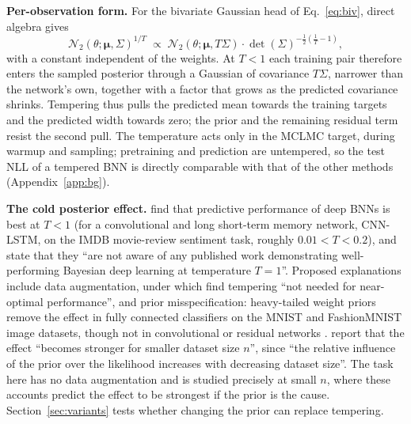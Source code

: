 \documentclass[11pt]{article}
\begin{document}
\textbf{Per-observation form.} For the bivariate Gaussian head of Eq.~\eqref{eq:biv}, direct algebra gives
\begin{equation}
\label{eq:tempered_obs}
\mathcal{N}_2(\theta;\boldsymbol\mu,\Sigma)^{1/T}\;\propto\;\mathcal{N}_2(\theta;\boldsymbol\mu,T\Sigma)\cdot\det(\Sigma)^{-\frac12\left(\frac1T-1\right)},
\end{equation}
with a constant independent of the weights. At $T<1$ each training pair therefore enters the sampled posterior
through a Gaussian of covariance $T\Sigma$, narrower than the network's own, together with a factor that grows
as the predicted covariance shrinks. Tempering thus pulls the predicted mean towards the training targets and
the predicted width towards zero; the prior and the remaining residual term resist the second pull.
The temperature acts only in the MCLMC target, during warmup and sampling; pretraining and prediction are untempered,
so the test NLL of a tempered BNN is directly comparable with that of the other methods (Appendix~\ref{app:bg}).

\textbf{The cold posterior effect.} \citet{wenzel2020cold} find that predictive performance of deep BNNs is
best at $T<1$ (for a convolutional and long short-term memory network,
CNN-LSTM, on the IMDB movie-review sentiment task, roughly $0.01<T<0.2$), and state that they ``are not aware of any published
work demonstrating well-performing Bayesian deep learning at temperature $T=1$''. Proposed explanations include
data augmentation, under which \citet{izmailov2021bnn} find tempering ``not needed for near-optimal performance'',
and prior misspecification: heavy-tailed weight priors remove the effect in fully connected classifiers on
the MNIST and FashionMNIST image datasets, though not in convolutional or residual networks \citep{fortuin2022priors}.
\citet{noci2021disentangling} report that the effect ``becomes stronger for smaller dataset size $n$'', since ``the
relative influence of the prior over the likelihood increases with decreasing dataset size''. The task here has
no data augmentation and is studied precisely at small $n$, where these accounts predict the effect to be strongest
if the prior is the cause. Section~\ref{sec:variants} tests whether changing the prior can replace tempering.
\end{document}
